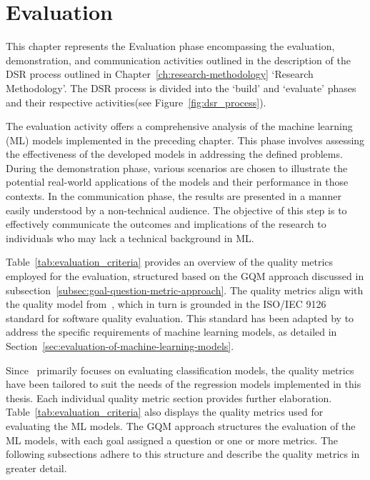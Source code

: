 \chapter{Evaluation}\label{ch:evaluation}
This chapter represents the Evaluation phase encompassing the evaluation, demonstration, and
communication activities outlined in the description of the \ac{DSR} process outlined in
Chapter~\ref{ch:research-methodology} `Research Methodology'.
The \ac{DSR} process is divided into the `build' and `evaluate' phases and their respective
activities(see Figure~\ref{fig:dsr_process}).

The evaluation activity offers a comprehensive analysis of the machine learning (ML) models implemented in the
preceding chapter.
This phase involves assessing the effectiveness of the developed models in addressing the defined
problems.
During the demonstration phase, various scenarios are chosen to illustrate the potential real-world
applications of the models and their performance in those contexts.
In the communication phase, the results are presented in a manner easily understood by a non-technical audience.
The objective of this step is to effectively communicate the outcomes and implications of the research to individuals
who may lack a technical background in ML.

Table~\ref{tab:evaluation_criteria} provides an overview of the quality metrics employed for the evaluation,
structured based on the \ac{GQM} approach discussed in subsection~\ref{subsec:goal-question-metric-approach}.
The quality metrics align with the quality model from~\cite{siebert2022construction}, which in turn is grounded in
the ISO/IEC 9126 standard for software quality evaluation.
This standard has been adapted by\cite{siebert2022construction} to address the specific requirements of machine
learning models, as detailed in Section~\ref{sec:evaluation-of-machine-learning-models}.

Since~\cite{siebert2022construction} primarily focuses on evaluating classification models, the quality metrics have
been tailored to suit the needs of the regression models implemented in this thesis.
Each individual quality metric section provides further elaboration.
Table~\ref{tab:evaluation_criteria} also displays the quality metrics used for evaluating the \ac{ML} models.
The \ac{GQM} approach structures the evaluation of the \ac{ML} models, with each goal assigned a question or one or
more metrics.
The following subsections adhere to this structure and describe the quality metrics in greater detail.


